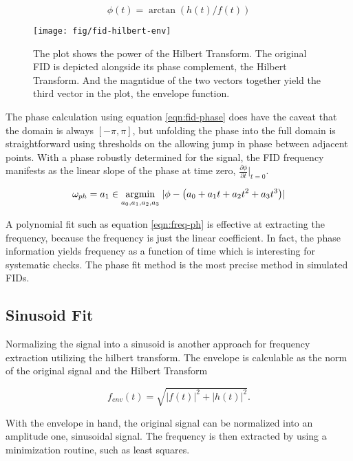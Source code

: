 \begin{equation}
\label{eqn:fid-phase}
\phi(t) = \arctan(h(t) / f(t))
\end{equation}

\begin{figure}
\texttt{[image: fig/fid-hilbert-env]}
\caption{
    The plot shows the power of the Hilbert Transform.  The original FID is depicted alongside its phase complement, the Hilbert Transform.  And the magntidue of the two vectors together yield the third vector in the plot, the envelope function.
    \label{fig:fid-hilbert-env}
}
\end{figure}

\noindent
The phase calculation using equation \ref{eqn:fid-phase} does have the caveat that the domain is always $[-\pi, \pi]$, but unfolding the phase into the full domain is straightforward using thresholds on the allowing jump in phase between adjacent points.  With a phase robustly determined for the signal, the FID frequency manifests as the linear slope of the phase at time zero, $\frac{\partial \phi}{\partial t}|_{t=0}$.

\begin{equation}
\label{eqn:freq-ph}
\omega_{ph} = a_1 \in \operatorname*{argmin}_{a_0, a_1, a_2, a_3} \;
\lvert \phi - \left(a_0 + a_1 t + a_2 t^2 + a_3 t^3\right) \rvert
\end{equation}

A polynomial fit such as equation \ref{eqn:freq-ph} is effective at extracting the frequency, because the frequency is just the linear coefficient.  In fact, the phase information yields frequency as a function of time which is interesting for systematic checks.  The phase fit method is the most precise method in simulated FIDs.

\subsection{Sinusoid Fit}
Normalizing the signal into a sinusoid is another approach for frequency extraction utilizing the hilbert transform.  The envelope is calculable as the norm of the original signal and the Hilbert Transform

\begin{equation}
\label{eqn:fid-envelope}
f_{env}(t) = \sqrt{|f(t)|^2 + |h(t)|^2}.
\end{equation}

\noindent 
With the envelope in hand, the original signal can be normalized into an amplitude one, sinusoidal signal.  The frequency is then extracted by using a minimization routine, such as least squares.

